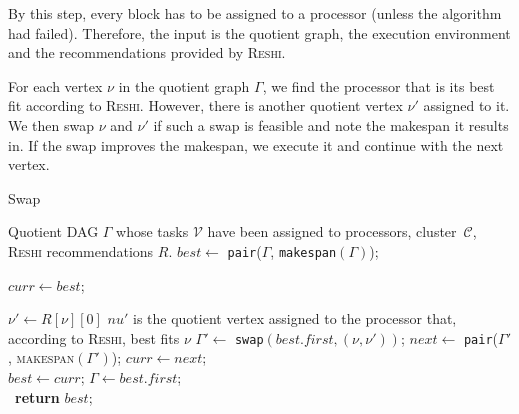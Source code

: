\documentclass[11pt]{article}
\newcommand{\algo}[1]{\textsc{#1}}
\newcommand{\reshi}{\algo{Reshi}\xspace}
\newcommand{\cluster}{\,\mathcal{C}}
\begin{document}
    By this step, every block has to be assigned to a processor (unless the algorithm had failed).
    Therefore, the input is the quotient graph, the execution environment and the recommendations provided by \reshi.

    For each vertex $\nu$ in the quotient graph $\Gamma$, we find the processor that is its best fit according to \reshi.
    However, there is another quotient vertex $\nu'$ assigned to it.
    We then swap $\nu$ and $\nu'$ if such a swap is feasible and note the makespan it results in.
    If the swap improves the makespan, we execute it and continue with the next vertex.


    \begin{algorithm}[b!]
        \caption{Swap}
        \label{alg:ReshiSwap}
        \begin{algorithmic}[1]
            \Function{\algo{swap}}{$\Gamma$, $\cluster$, $R$}
                \Comment Quotient DAG $\Gamma$ whose tasks $\mathcal{V}$ have been assigned to processors, cluster $\cluster$, \reshi recommendations $R$.
                \State $best \gets$ \texttt{pair}($\Gamma$, \texttt{makespan}$(\Gamma)$); \label{line:init-best}

                \State $curr \gets best$;


                    \State $\nu' \gets R[\nu][0]$ \Comment $nu'$ is the quotient vertex assigned to the processor that, according to \reshi, best fits $\nu$
                        \label{line:feasible-swaps}
                        \State $\Gamma' \gets$ \texttt{swap}$(best.first, (\nu, \nu'))$; \label{line:swap}
                        \State $next \gets$ \texttt{pair}($\Gamma'$, \algo{makespan}$(\Gamma')$);
                            \State $curr \gets next$; \label{line:improvement-found}\\
                        \EndIf
                    \EndIf
                \EndFor \label{line:forall-pairs-end}
                    \State $best \gets curr$; $\Gamma \gets  best.first$;  \label{line:new-best}\\
                \Else
                    ~\textbf{return} $best$; \label{line:return}\\
                \EndIf
                \EndWhile

            \EndFunction
        \end{algorithmic}
    \end{algorithm}
\end{document}
